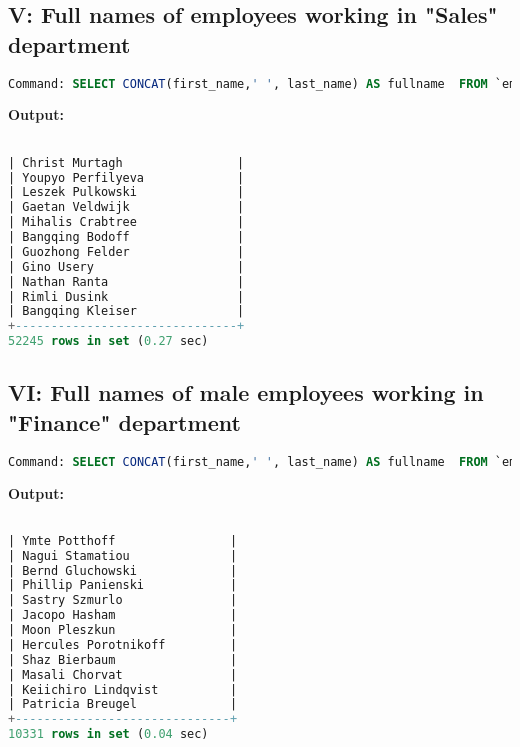 \documentclass[12pt]{report}
\begin{document}
\subsection*{V: Full names of employees working in "Sales" department}

\begin{lstlisting}[language=sql]
Command: SELECT CONCAT(first_name,' ', last_name) AS fullname  FROM `employees` t1 JOIN `dept_emp` t2 ON t1.emp_no=t2.emp_no JOIN `departments` t3 ON t2.dept_no=t3.dept_no WHERE t3.`dept_name` = 'Sales';
\end{lstlisting}
\textbf{Output:}

\begin{lstlisting}[language=sql]

| Christ Murtagh                |
| Youpyo Perfilyeva             |
| Leszek Pulkowski              |
| Gaetan Veldwijk               |
| Mihalis Crabtree              |
| Bangqing Bodoff               |
| Guozhong Felder               |
| Gino Usery                    |
| Nathan Ranta                  |
| Rimli Dusink                  |
| Bangqing Kleiser              |
+-------------------------------+
52245 rows in set (0.27 sec)


\end{lstlisting}



\subsection*{VI: Full names of male employees working in "Finance" department}

\begin{lstlisting}[language=sql]
Command: SELECT CONCAT(first_name,' ', last_name) AS fullname  FROM `employees` t1 JOIN `dept_emp` t2 ON t1.emp_no=t2.emp_no JOIN `departments` t3 ON t2.dept_no=t3.dept_no WHERE t3.`dept_name` = 'Finance' AND t1.gender='M';
\end{lstlisting}
\textbf{Output:}
\begin{lstlisting}[language=sql]

| Ymte Potthoff                |
| Nagui Stamatiou              |
| Bernd Gluchowski             |
| Phillip Panienski            |
| Sastry Szmurlo               |
| Jacopo Hasham                |
| Moon Pleszkun                |
| Hercules Porotnikoff         |
| Shaz Bierbaum                |
| Masali Chorvat               |
| Keiichiro Lindqvist          |
| Patricia Breugel             |
+------------------------------+
10331 rows in set (0.04 sec)
\end{lstlisting}
\end{document}

